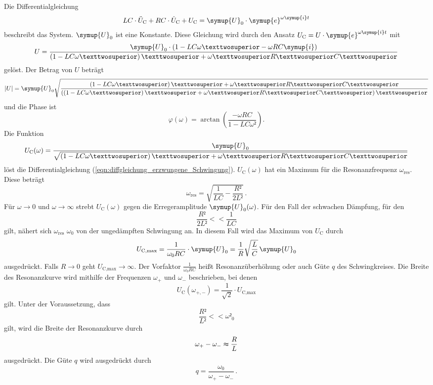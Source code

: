 Die Differentialgleichung 
\begin{equation}
    \label{eqn:diffgleichung_erzwungene_Schwingung}
    LC \cdot \ddot{U}_{\text{C}} + RC \cdot \dot{U}_{\text{C}} + U_{\text{C}} = \symup{U}_0 \cdot \symup{e}^{\omega \symup{i} t}
\end{equation}
beschreibt das System. $\symup{U}_0$ ist eine Konstante. Diese Gleichung wird durch den Ansatz $U_{\text{C}} = U \cdot \symup{e}^{\omega \symup{i}t}$ mit
\begin{equation}
    U = \frac{\symup{U}_0 \cdot \left(1 - LC \omega² - \omega R C \symup{i}\right)}{\left(1 - LC \omega²\right)² + \omega² R² C²}
\end{equation}
gelöst. Der Betrag von $U$ beträgt 
\begin{equation}
    |U| = \symup{U}_0 \sqrt{\frac{\left(1 - LC \omega²\right)² + \omega² R² C²}{\left(\left(1 - LC\omega²\right)² + \omega² R² C²\right)²}} 
\end{equation}
und die Phase ist
\begin{equation}
    \varphi (\omega) = \arctan{\left(\frac{- \omega R C}{1 - L C \omega²} \right)}. 
\end{equation}
Die Funktion 
\begin{equation}
    U_{\text{C}}(\omega) = \frac{\symup{U}_0}{\sqrt{\left(1 - LC \omega²\right)² + \omega² R² C²}}
\end{equation}
löst die Differentialgleichung (\ref{eqn:diffgleichung_erzwungene_Schwingung}).
$U_{\text{C}}(\omega)$ hat ein Maximum für die Resonanzfrequenz $\omega_{\text{res}}$.
Diese beträgt
$$\omega_{\text{res}} = \sqrt{\frac{1}{LC} - \frac{R²}{2L²}}\, .$$
Für $\omega \rightarrow 0$ und $\omega \rightarrow \infty$ strebt $U_{\text{C}}(\omega)$
gegen die Erregeramplitude $\symup{U}_{\text{0}}(\omega)$.
Für den Fall der schwachen Dämpfung, für den 
$$\frac{R²}{2L²} << \frac{1}{LC}$$
gilt, nähert sich $\omega_{\text{res}}$ $\omega_0$ von der ungedämpften Schwingung an. 
In diesem Fall wird das Maximum von $U_{\text{C}}$ durch 
$$U_{\text{C,max}} =  \frac{1}{\omega_0 R C} \cdot \symup{U}_0 = \frac{1}{R}\sqrt{\frac{L}{C}} \, \symup{U}_0$$
ausgedrückt. 
Falls $R \rightarrow 0$ geht $U_{\text{C,max}} \rightarrow \infty$. Der Vorfaktor 
$\frac{1}{\omega_0 R C}$ heißt Resonanzüberhöhung oder auch Güte $q$ des Schwingkreises.
Die Breite des Resonanzkurve wird mithilfe der Frequenzen $\omega_+$ und $\omega_-$ beschrieben, 
bei denen 
$$U_{\text{C}}(\omega_{+,-}) = \frac{1}{\sqrt{2}} \cdot U_{\text{C,max}}$$
gilt. Unter der Voraussetzung, dass 
$$\frac{R²}{L²} << \omega²_0$$
gilt, wird die Breite der Resonanzkurve durch 
\begin{equation}
\omega_+ - \omega_- \thickapprox \frac{R}{L}
\end{equation}
ausgedrückt.
Die Güte $q$ wird ausgedrückt durch
\begin{equation}
    q = \frac{\omega_0}{\omega_+ - \omega_- } \, .
\end{equation}